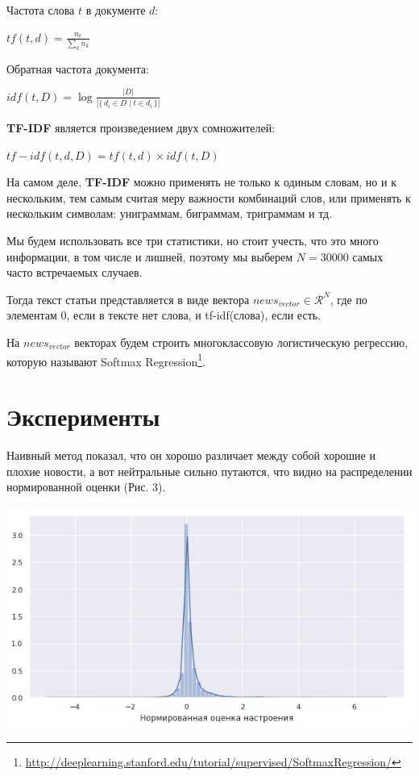 \documentclass[12pt]{article}
\begin{document}
            Частота слова $t$ в документе $d$: 
            \begin{center}
                ${{tf} (t,d)={\frac {n_{t}}{\sum _{k}n_{k}}}}$
            \end{center}
            
            Обратная частота документа:
            \begin{center}
                ${idf} (t,D)=\log {\frac {|D|}{|\{\,d_{i}\in D\mid t\in d_{i}\,\}|}}$
            \end{center}

            \textbf{TF-IDF} является произведением двух сомножителей: 
            \begin{center}
                ${tf-idf}(t,d,D) = {tf}(t,d)\times {idf}(t,D)$
            \end{center}

            На самом деле, \textbf{TF-IDF} можно применять не только к одиным словам, но и к нескольким, тем
            самым считая меру важности комбинаций слов, или применять к нескольким символам:
            униграммам, биграммам, триграммам и тд. 

            Мы будем использовать все три статистики, но стоит учесть, что это много информации, в том числе и лишней,
            поэтому мы выберем $N = 30000$ самых часто встречаемых случаев. 

            Тогда текст статьи представляется в виде вектора $news_{vector} \in \mathcal{R}^N$, где по элементам 0, 
            если в тексте нет слова, и tf-idf(слова), если есть.

            На $news_{vector}$ векторах будем строить многоклассовую логистическую регрессию,
            которую называют Softmax Regression\footnote{\href{http://deeplearning.stanford.edu/tutorial/supervised/SoftmaxRegression/}{http://deeplearning.stanford.edu/tutorial/supervised/SoftmaxRegression/}}.

    \section{Эксперименты}
        Наивный метод показал, что он хорошо различает между собой хорошие и плохие новости,
        а вот нейтральные сильно путаются, что видно на распределении нормированной оценки (Рис. 3).
        \begin{center}
            \includegraphics[scale=0.7]{naive_norm}
        \end{center}
\end{document}
